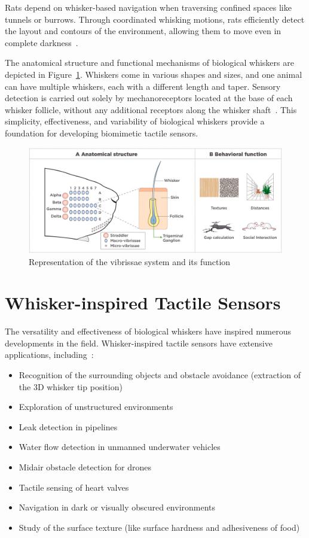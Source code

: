 Rats depend on whisker-based navigation when traversing confined spaces like tunnels or burrows.
Through coordinated whisking motions, rats efficiently detect the layout and contours of the environment, allowing them to move even in complete darkness~\cite{wolfe2008texture}.

The anatomical structure and functional mechanisms of biological whiskers are depicted in Figure~\ref{fig:whisker-anatomy}.
Whiskers come in various shapes and sizes, and one animal can have multiple whiskers, each with a different length and taper.
Sensory detection is carried out solely by mechanoreceptors located at the base of each whisker follicle, without any additional receptors along the whisker shaft~\cite{doi:10.1089/soro.2016.0028}.
This simplicity, effectiveness, and variability of biological whiskers provide a foundation for developing biomimetic tactile sensors.

\begin{figure}[htb]
    \centering
    \includegraphics[width=\textwidth]{figures/whisker-anatomy}
    \caption{Representation of the vibrissae system and its function~\cite{IBARRACASTANEDA2022100034}}
    \label{fig:whisker-anatomy}
\end{figure}


\section{Whisker-inspired Tactile Sensors}

The versatility and effectiveness of biological whiskers have inspired numerous developments in the field.
Whisker-inspired tactile sensors have extensive applications, including~\cite{s22072705}:
\begin{itemize}
    \item Recognition of the surrounding objects and obstacle avoidance (extraction of the 3D whisker tip position)
    \item Exploration of unstructured environments
    \item Leak detection in pipelines
    \item Water flow detection in unmanned underwater vehicles
    \item Midair obstacle detection for drones
    \item Tactile sensing of heart valves
    \item Navigation in dark or visually obscured environments
    \item Study of the surface texture (like surface hardness and adhesiveness of food)~\cite{https://doi.org/10.1002/aisy.202300660}
\end{itemize}

